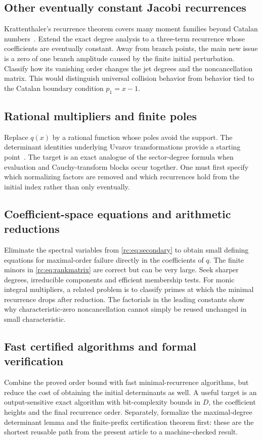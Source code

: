 \documentclass[11pt,a4paper]{article}
\numberwithin{equation}{section}
\theoremstyle{definition}
\theoremstyle{remark}
\begin{document}
\subsection{Other eventually constant Jacobi recurrences}\label{ic:x:rcq5}
Krattenthaler's recurrence theorem covers many moment families beyond
Catalan numbers~\cite{Krattenthaler2023}.  Extend the exact degree analysis to a
three-term recurrence whose coefficients are eventually constant.
Away from branch points, the main new issue is a zero of one branch
amplitude caused by the finite initial perturbation.  Classify how its
vanishing order changes the jet degrees and the noncancellation matrix.
This would distinguish universal collision behavior from behavior tied
to the Catalan boundary condition $p_1=x-1$.

\subsection{Rational multipliers and finite poles}
Replace $q(x)$ by a rational function whose poles avoid the support.
The determinant identities underlying Uvarov transformations provide a
starting point~\cite{Krattenthaler2021Uvarov}.  The target is an exact analogue of the
sector-degree formula when evaluation and Cauchy-transform blocks occur
together.  One must first specify which normalizing factors are removed
and which recurrences hold from the initial index rather than only
eventually.

\subsection{Coefficient-space equations and arithmetic reductions}
Eliminate the spectral variables from \eqref{rc:eq:secondary} to obtain
small defining equations for maximal-order failure directly in the
coefficients of $q$.  The finite minors in \eqref{rc:eq:rankmatrix} are
correct but can be very large.  Seek sharper degrees, irreducible
components and efficient membership tests.  For monic integral
multipliers, a related problem is to classify primes at which the
minimal recurrence drops after reduction.  The factorials in the
leading constants show why characteristic-zero noncancellation cannot
simply be reused unchanged in small characteristic.

\subsection{Fast certified algorithms and formal verification}
Combine the proved order bound with fast minimal-recurrence algorithms,
but reduce the cost of obtaining the initial determinants as well.
A useful target is an output-sensitive exact algorithm with bit-complexity
bounds in $D$, the coefficient heights and the final recurrence order.
Separately, formalize the maximal-degree determinant lemma and the
finite-prefix certification theorem first: these are the shortest
reusable path from the present article to a machine-checked result.
\end{document}
